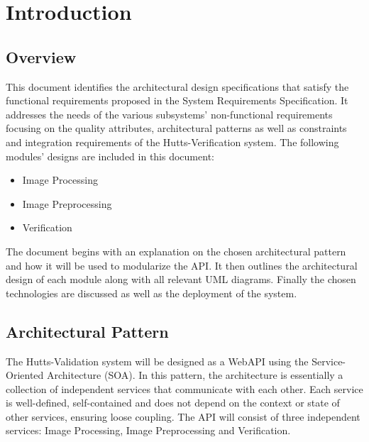 \documentclass{article}
\begin{document}
\cleardoublepage
\thispagestyle{empty}
\tableofcontents
\newpage

\setcounter{page}{1}
	\section{Introduction}
	\subsection{Overview}
This document identifies the architectural design specifications that satisfy the functional requirements proposed in the System Requirements Specification. It addresses the needs of the various subsystems' non-functional requirements focusing on the quality attributes, architectural patterns as well as constraints and integration requirements of the Hutts-Verification system.\newline \newline 
The following modules' designs are included in this document:
\begin{itemize}
	\item Image Processing
	\item Image Preprocessing
	\item Verification
\end{itemize}
The document begins with an explanation on the chosen architectural pattern and how it will be used to modularize the API. It then outlines the architectural design of each module along with all relevant UML diagrams. Finally the chosen technologies are discussed as well as the deployment of the system. 

\subsection{Architectural Pattern}
The Hutts-Validation system will be designed as a WebAPI using the Service-Oriented Architecture (SOA). In this pattern, the architecture is essentially a collection of independent services that communicate with each other. Each service is well-defined, self-contained and does not depend on the context or state of other services, ensuring loose coupling. The API will consist of three independent services: Image Processing, Image Preprocessing and Verification. 
\end{document}
